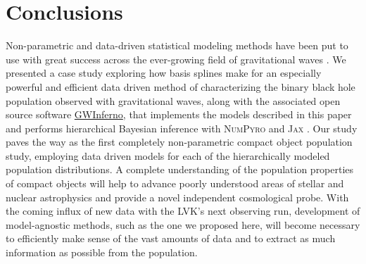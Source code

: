 \section{Conclusions}\label{sec:conclusion}

Non-parametric and data-driven statistical modeling methods have been put to use with great success across the ever-growing field of gravitational 
waves \citep{B_Farr_etal_2014,Littenberg_2015,Mandel_2016,Edwards_2018,Doctor_GPR,Edelman_2021,Vitale_2021,Tiwari_2021_a,Tiwari_2021_b,Edelman_2022ApJ,Tiwari_2022ApJ,ModelExploration_MaxPopLike}. 
We presented a case study exploring how basis splines make for an especially powerful and efficient data driven method of characterizing the binary black hole population observed 
with gravitational waves, along with the associated open source software \href{https://git.ligo.org/bruce.edelman/gwinferno}{GWInferno}, that implements the models 
described in this paper and performs hierarchical Bayesian inference with \textsc{NumPyro} and \textsc{Jax} \citep{pyro,numpyro,jax}. 
Our study paves the way as the first completely non-parametric compact object population study, employing data driven models for each of the hierarchically 
modeled population distributions. A complete understanding of the population properties of compact objects will help to advance poorly understood areas of stellar and 
nuclear astrophysics and provide a novel independent cosmological probe. With the coming influx of new data with the LVK's next observing run, development of model-agnostic methods, such as the one we proposed here, will become necessary to efficiently make
sense of the vast amounts of data and to extract as much information as possible from the population. 